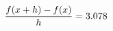 \documentclass[preview]{standalone}
\begin{document}
\begin{align*}
\special{dvisvgm:raw <g id='unique000'>}\frac{f(x+h)-f(x)}{h} = 3.078\special{dvisvgm:raw </g>}
\end{align*}
\end{document}
